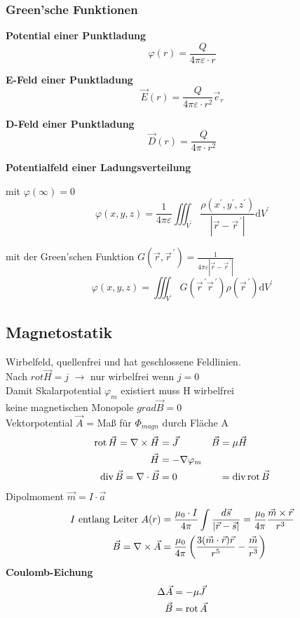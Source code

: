 \subsubsection{Green'sche Funktionen}
\textbf{Potential einer Punktladung}
\[ \varphi (r) = \dfrac{Q}{4 \pi \varepsilon \cdot r} \]

\textbf{E-Feld einer Punktladung}
\[ \vec{E}(r) = \dfrac{Q}{4 \pi \varepsilon \cdot r^2} \vec{e}_r \]

\textbf{D-Feld einer Punktladung}
\[ \vec{D}(r) = \dfrac{Q}{4 \pi \cdot r^2} \]

\textbf{Potentialfeld einer Ladungsverteilung}

mit $\varphi(\infty)=0$
\[
    \varphi(x, y, z)=\frac{1}{4 \pi \varepsilon} \iiint_{V^{\prime}}
    \frac{\rho\left(x^{\prime}, y^{\prime},
        z^{\prime}\right)}{\left|\vec{r}-\vec{r}^{\,\prime}\right|} \mathrm{d}
    V^{\prime}
\]

mit der Green'schen Funktion $G\left(\vec{r}, \vec{r}^{\,\prime}\right)=\frac{1}{4 \pi \varepsilon\left|\vec{r}-\vec{r}^{\,\prime}\right|}$
\[\varphi(x, y, z)=\iiint_{V^{\prime}} G\left(\vec{r}^{\,\prime} \vec{r}^{\,\prime}\right) \rho\left(\vec{r}^{\,\prime}\right) \mathrm{d} V^{\prime}\]


\subsection{Magnetostatik}
\textbullet Wirbelfeld, quellenfrei und hat geschlossene Feldlinien.\\
\textbullet Nach $rot \vec{H} = j$ $\rightarrow$ nur wirbelfrei wenn $j = 0$\\
\textbullet Damit Skalarpotential $ \varphi_m$ existiert muss H wirbelfrei\\
\textbullet keine magnetischen Monopole $grad \vec{B} = 0$\\
\textbullet Vektorpotential $ \vec{A}$ = Maß für $\Phi_{magn} $ durch Fläche A
\begin{align*}
    \operatorname{rot} \vec{H} = \nabla \times \vec{H} & = \vec{J}            & \vec{B} & = \mu \vec{H}           \\
    \vec{H}                                & = - \nabla \varphi_m &                                   \\
    \operatorname{div} \vec{B} = \nabla \cdot \vec{B}  & = 0                  &         & = \operatorname{div} \operatorname{rot} \vec{B}
\end{align*}
Dipolmoment $ \vec{m} = I \cdot \vec{a}$
\begin{align*}
    I\textnormal{ entlang Leiter } A(r) & = \frac{\mu_0 \cdot I}{4 \pi} \int \frac{d \vec{s}}{| \vec{r} - \vec{s}|} = \frac{ \mu_0}{4 \pi} \frac{\vec{m} \times \vec{r}}{r^3} \\
    \vec{B} = \nabla \times \vec{A}     & = \frac{\mu_0}{4 \pi} \left(\frac{3(\vec{m} \cdot \vec{r})\vec{r}}{r^5} - \frac{\vec{m}}{r^3}\right)
\end{align*}
\textbf{Coulomb-Eichung}
\begin{align*}
    \Delta \vec{A} & = - \mu \vec{J}  \\
    \vec{B}        & = \operatorname{rot} \vec{A}
\end{align*}

